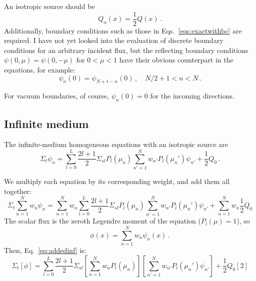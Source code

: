 \documentclass[]{SRJcommon}
\begin{document}
An isotropic source should be 
\begin{equation}
Q_n(x) = \frac{1}{2} Q(x) \,.
  \label{eq:isotropicsource}
\end{equation}
Additionally, boundary conditions such as those in
Eqs.~\eqref{eqs:exactwithbc} are required. I have not yet looked into the
evaluation of discrete boundary conditions for an arbitrary incident flux, but
the reflecting boundary conditions $\psi(0, \mu) = \psi(0, -\mu)$ for $0 < \mu
< 1$ have their obvious counterpart in the \SN{} equations, for example:
$$ \psi_{n}(0) = \psi_{N + 1 - n}(0) \,, \quad N/2 + 1 < n < N  \,.$$

For vacuum boundaries, of course, $\psi_{n}(0) = 0$ for the incoming directions.

\subsection{Infinite medium}
The infinite-medium homogeneous \SN{} equations with an isotropic source are
$$\Sigma_t \psi_n 
= \sum_{l=0}^{L}  \frac{2l+1}{2} \Sigma_{sl} P_{l}(\mu_n)
  \sum_{n'=1}^{N} w_{n'} P_{l} (\mu_n') \psi_{n'}
  + \frac{1}{2} Q_0 \,.$$

We multiply each equation by its corresponding weight, and add them all
together:
\begin{equation}
\Sigma_t \sum_{n=1}^{N} w_{n} \psi_{n} 
= \sum_{n=1}^{N} w_{n} \sum_{l=0}^{L}  \frac{2l+1}{2} \Sigma_{sl} P_{l}(\mu_n)
  \sum_{n'=1}^{N} w_{n'} P_{l} (\mu_n') \psi_{n'}
  + \sum_{n=1}^{N} w_{n} \frac{1}{2} Q_0
  \label{eq:addedinf}
\end{equation}
The scalar flux is the zeroth Legendre moment of the equation ($P_l(\mu) = 1$),
so
$$ \phi(x) = \sum_{n=1}^{N} w_{n} \psi_{n}(x) \,.$$
Then, Eq.~\eqref{eq:addedinf} is:
$$ \Sigma_t [\phi] 
= \sum_{l=0}^{L}  \frac{2l+1}{2} \Sigma_{sl} \left[ \sum_{n=1}^{N} w_{n}
P_{l}(\mu_n) \right] \left[ \sum_{n'=1}^{N} w_{n'} P_{l} (\mu_n') \psi_{n'}
\right] + \frac{1}{2} Q_0 [2] $$
\end{document}
